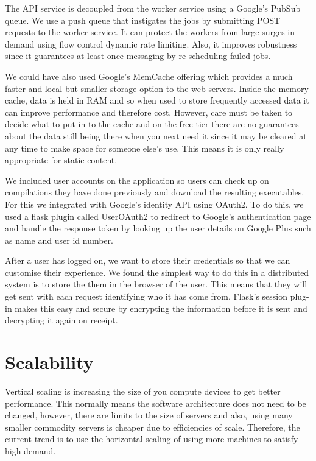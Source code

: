 \documentclass[conference]{IEEEtran}
\begin{document}
The API service is decoupled from the worker service using a Google's PubSub
queue\cite{pubsub}. We use a push queue that instigates the jobs by submitting
POST requests to the worker service. It can protect the workers from large
surges in demand using flow control dynamic rate limiting. Also, it improves
robustness since it guarantees at-least-once messaging by re-scheduling failed
jobs.

We could have also used Google's MemCache\cite{mem} offering which provides a
much faster and local but smaller storage option to the web servers. Inside the
memory cache, data is held in RAM and so when used to store frequently accessed
data it can improve performance and therefore cost. However, care must be taken
to decide what to put in to the cache and on the free tier there are no
guarantees about the data still being there when you next need it since it may
be cleared at any time to make space for someone else's use. This means it is
only really appropriate for static content.

We included user accounts on the application so users can check up on compilations they have done previously and download the resulting executables. For this we integrated with Google's identity API using OAuth2. To do this, we used a flask plugin called UserOAuth2\cite{oauth} to redirect to Google's authentication page and handle the response token by looking up the user details on Google Plus such as name and user id number. 

After a user has logged on, we want to store their credentials so that we can customise their experience. We found the simplest way to do this in a distributed system is to store the them in the browser of the user. This means that they will get sent with each request identifying who it has come from. Flask's session plug-in makes this easy and secure by encrypting the information before it is sent and decrypting it again on receipt.

\section{Scalability}

Vertical scaling is increasing the size of you compute devices to get better
performance. This normally means the software architecture does not need to be
changed, however, there are limits to the size of servers and also, using many
smaller commodity servers is cheaper due to efficiencies of scale. Therefore,
the current trend is to use the horizontal scaling of using more machines to
satisfy high demand.
\end{document}
